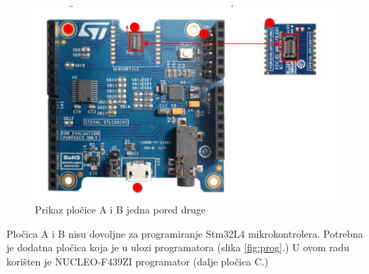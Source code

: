 \documentclass[times, utf8, diplomski]{diplomski}
\begin{document}
\begin{figure}[H]
\includegraphics[scale=0.5]{PlocicaAiB.png}
\centering
\caption{Prikaz pločice A i B jedna pored druge\cite{gettingstartedsensor}}
\label{fig:plocab}
\end{figure}

Pločica A i B nisu dovoljne za programiranje Stm32L4 mikrokontrolera. Potrebna je dodatna pločica koja je u ulozi programatora (slika \ref{fig:prog}.) U ovom radu korišten je NUCLEO-F439ZI programator
(dalje pločica C.)
\end{document}
